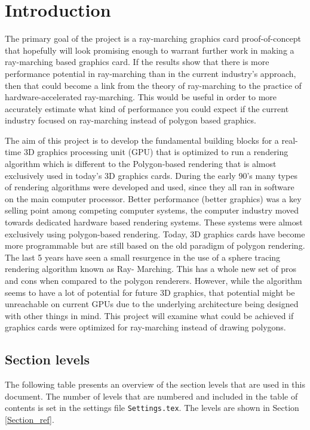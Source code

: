 \chapter{Introduction} 

The primary goal of the project is a ray-marching graphics card
proof-of-concept that hopefully will look promising enough to warrant further
work in making a ray-marching based graphics card. If the results show that
there is more performance potential in ray-marching than in the current
industry’s approach, then that could become a link from the theory of
ray-marching to the practice of hardware-accelerated ray-marching. This would
be useful in order to more accurately estimate what kind of performance you
could expect if the current industry focused on ray-marching instead of polygon
based graphics.

The aim of this project is to develop the fundamental building blocks for a real-
time 3D graphics processing unit (GPU) that is optimized to run a rendering 
algorithm which is different to the Polygon-based rendering that is almost 
exclusively used in today's 3D graphics cards. During the early 90’s many types of 
rendering algorithms were developed and used, since they all ran in software on the 
main computer processor. Better performance (better graphics) was a key selling 
point among competing computer systems, the computer industry moved towards 
dedicated hardware based rendering systems. These systems were almost exclusively 
using polygon-based rendering. Today, 3D graphics cards have become more 
programmable but are still based on the old paradigm of polygon rendering. The last 
5 years have seen a small resurgence in the use of a sphere tracing rendering 
algorithm known as Ray- Marching. This has a whole new set of pros and cons when 
compared to the polygon renderers.  However, while the algorithm seems to have a lot 
of potential for future 3D graphics, that potential might be unreachable on current 
GPUs due to the underlying architecture being designed with other things in mind. 
This project will examine what could be achieved if graphics cards were optimized 
for ray-marching instead of drawing polygons.  



\section{Section levels}
The following table presents an overview of the section levels that are used in this 
document. The number of levels that are numbered and included in the table of contents is 
set in the settings file \texttt{Settings.tex}. 
The levels are shown in Section \ref{Section_ref}.

